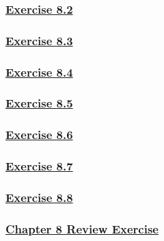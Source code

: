 \documentclass[
  11pt,
]{book}
\begin{document}
\subsubsection*{\texorpdfstring{\hyperref[ex82q]{Exercise 8.2}}{Exercise 8.2}}\label{exercise-8.2-1}

\subsubsection*{\texorpdfstring{\hyperref[ex83q]{Exercise 8.3}}{Exercise 8.3}}\label{exercise-8.3-1}

\subsubsection*{\texorpdfstring{\hyperref[ex84q]{Exercise 8.4}}{Exercise 8.4}}\label{exercise-8.4-1}

\subsubsection*{\texorpdfstring{\hyperref[ex85q]{Exercise 8.5}}{Exercise 8.5}}\label{exercise-8.5-1}

\subsubsection*{\texorpdfstring{\hyperref[ex86q]{Exercise 8.6}}{Exercise 8.6}}\label{exercise-8.6-1}

\subsubsection*{\texorpdfstring{\hyperref[ex87q]{Exercise 8.7}}{Exercise 8.7}}\label{exercise-8.7-1}

\subsubsection*{\texorpdfstring{\hyperref[ex88q]{Exercise 8.8}}{Exercise 8.8}}\label{exercise-8.8-1}

\subsubsection*{\texorpdfstring{\hyperref[re8q]{Chapter 8 Review Exercise}}{Chapter 8 Review Exercise}}\label{chapter-8-review-exercise}
\end{document}
